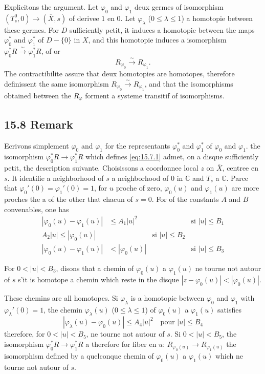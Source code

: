 \documentclass[12pt,a4paper]{article}
\theoremstyle{plain}
\theoremstyle{definition}
\theoremstyle{remark}
\newcommand{\bC}{\mathbb{C}}
\begin{document}
Explicitons the argument. Let $\varphi_0$ and $\varphi_1$ deux germes of isomorphism $(T_s^0, 0) \to (\overline{X}, s)$ of derivee $1$ en $0$. Let $\varphi_\lambda$ ($0 \leqslant \lambda \leqslant 1$) a homotopie between these germes. For $D$ sufficiently petit, it induces a homotopie between the maps $\varphi_0^*$ and $\varphi_1^*$ of $D - \{0\}$ in $X$, and this homotopie induces a isomorphism $\varphi_0^* R \xrightarrow{\sim} \varphi_1^* R$, of or
\begin{equation}\label{eq:15.7.1}
R_{\varphi_0} \xrightarrow{\sim} R_{\varphi_1}.
\end{equation}
The contractibilite assure that deux homotopies are homotopes, therefore definissent the same isomorphism $R_{\varphi_0} \xrightarrow{\sim} R_{\varphi_1}$, and that the isomorphisms obtained between the $R_\varphi$ forment a systeme transitif of isomorphisms.

\subsection*{15.8 Remark}

Ecrivons simplement $\varphi_0$ and $\varphi_1$ for the representants $\varphi_0^*$ and $\varphi_1^*$ of $\varphi_0$ and $\varphi_1$. the isomorphism $\varphi_0^* R \to \varphi_1^* R$ which defines \eqref{eq:15.7.1} admet, on a disque sufficiently petit, the description suivante. Choisissons a coordonnee local $z$ on $\overline{X}$, centree en $s$. It identifie a neighborhood of $s$ a neighborhood of $0$ in $\bC$ and $T_s$ a $\bC$. Parce that $\varphi_0'(0) = \varphi_1'(0) = 1$, for $u$ proche of zero, $\varphi_0(u)$ and $\varphi_1(u)$ are more proches the a of the other that chacun of $s = 0$. For of the constants $A$ and $B$ convenables, one has
\begin{align}
|\varphi_0(u) - \varphi_1(u)| &\leqslant A_1 |u|^2 && \text{si } |u| \leqslant B_1 \label{eq:15.8.1}\\
A_2 |u| \leqslant |\varphi_0(u)| && \text{si } |u| \leqslant B_2 \label{eq:15.8.2}\\
|\varphi_0(u) - \varphi_1(u)| &< |\varphi_0(u)| && \text{si } |u| \leqslant B_3 \label{eq:15.8.3}
\end{align}

For $0 < |u| < B_3$, disons that a chemin of $\varphi_0(u)$ a $\varphi_1(u)$ ne tourne not autour of $s$ s'it is homotope a chemin which reste in the disque $|z - \varphi_0(u)| < |\varphi_0(u)|$.

These chemins are all homotopes. Si $\varphi_\lambda$ is a homotopie between $\varphi_0$ and $\varphi_1$ with $\varphi_\lambda'(0) = 1$, the chemin $\varphi_\lambda(u)$ ($0 \leqslant \lambda \leqslant 1$) of $\varphi_0(u)$ a $\varphi_1(u)$ satisfies
\[
|\varphi_\lambda(u) - \varphi_0(u)| \leqslant A_4 |u|^2 \quad \text{pour } |u| \leqslant B_4
\]
therefore, for $0 < |u| < B_5$, ne tourne not autour of $s$. Si $0 < |u| < B_5$, the isomorphism $\varphi_0^* R \to \varphi_1^* R$ a therefore for fiber en $u$: $R_{\varphi_0(u)} \to R_{\varphi_1(u)}$ the isomorphism defined by a quelconque chemin of $\varphi_0(u)$ a $\varphi_1(u)$ which ne tourne not autour of $s$.
\end{document}
